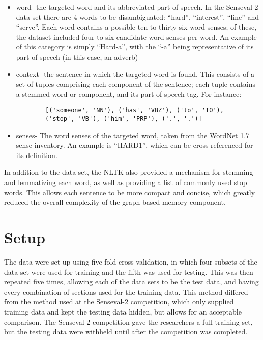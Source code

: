 \begin{itemize}     
	\item word- the targeted word and its abbreviated part of speech. In the 
	Senseval-2 data set there are 4 words to be disambiguated: ``hard'', 
	``interest'', ``line'' and ``serve''.  Each word contains a possible ten to thirty-six 
    word senses; of these, the dataset included four to six candidate word senses per word. 
    An example of this category is simply
	``Hard-a'', with the ``-a'' being representative of its part of speech (in 
	this case, an adverb)
	\item context- the sentence in which the targeted word is found. This consists of 
	a set of tuples comprising each component of the sentence; each tuple 
	contains a stemmed word or component, and its part-of-speech tag. For 
	instance: 
	\begin{verbatim}
		[('someone', 'NN'), ('has', 'VBZ'), ('to', 'TO'), 
		('stop', 'VB'), ('him', 'PRP'), ('.', '.')] 
	\end{verbatim}

	\item senses- The word senses of the targeted word, taken from the WordNet 
	1.7 sense inventory. An example is ``HARD1'', which can be cross-referenced 
	for its definition. 
\end{itemize}

In addition to the data set, the NLTK also provided a mechanism for stemming and
lemmatizing each word, as well as providing a list of commonly used stop words.
This allows each sentence to be more compact and concise, which greatly reduced
the overall complexity of the graph-based memory component.

\section{Setup}

The data were set up using five-fold cross validation, in which four subsets of
the data set were used for training and the fifth was used for testing. This
was then repeated five times, allowing each of the data sets to be the test
data, and having every combination of sections used for the training data.  This method
differed from the method used at the Senseval-2 competition, which only supplied training
data and kept the testing data hidden, but allows for an
acceptable comparison.  The Senseval-2 competition gave the researchers a full
training set, but the testing data were withheld until after the competition was completed.   

